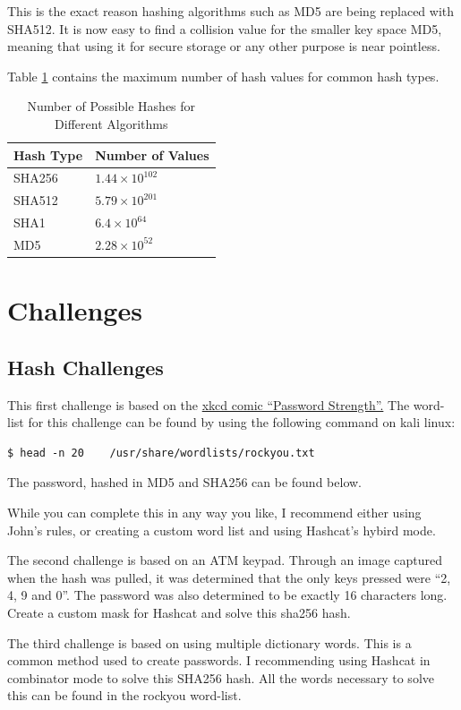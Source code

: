 			This is the exact reason hashing algorithms such as MD5 are being replaced with SHA512.
			It is now easy to find a collision value for the smaller key space MD5, meaning that using it for secure storage or any other purpose is near pointless.

			Table \ref{tab:HashCollisions} contains the maximum number of hash values for common hash types.
			\begin{table}[htb]
				\centering
				\begin{adjustbox}{max width=1\textwidth}
				\begin{tabular}{ll}
					\toprule
					\textbf{Hash Type} & \textbf{Number of Values} \\
					\toprule
					SHA256 & $1.44\times10^{102}$ \\
					SHA512 & $5.79\times10^{201}$ \\
					SHA1   & $6.4\times10^{64}$ \\
					MD5	   & $2.28\times10^{52}$ \\
					\bottomrule
				\end{tabular}
			\end{adjustbox}
				\label{tab:HashCollisions}
				\caption{Number of Possible Hashes for Different Algorithms}
			\end{table}
	\section{Challenges}
		\subsection{Hash Challenges}
			This first challenge is based on the \href{https://xkcd.com/936/}{xkcd comic ``Password Strength''.}
			The word-list for this challenge can be found by using the following command on kali linux:
			\begin{lstlisting}[style=CLI]
				$ head -n 20	/usr/share/wordlists/rockyou.txt
			\end{lstlisting}
			The password, hashed in MD5 and SHA256 can be found below.
			
			While you can complete this in any way you like, I recommend either using John's rules, or creating a custom word list and using Hashcat's hybird mode.

			The second challenge is based on an ATM keypad.
			Through an image captured when the hash was pulled, it was determined that the only keys pressed were ``2, 4, 9 and 0''.
			The password was also determined to be exactly 16 characters long.
			Create a custom mask for Hashcat and solve this sha256 hash.
			

			The third challenge is based on using multiple dictionary words.
			This is a common method used to create passwords.
			I recommending using Hashcat in combinator mode to solve this SHA256 hash.
			All the words necessary to solve this can be found in the rockyou word-list.
			
